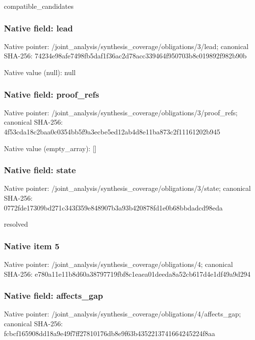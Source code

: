 \documentclass[10pt,a4paper]{article}
\begin{document}
\begingroup\raggedright\sloppy compatible\_\allowbreak{}candidates\par\endgroup

\subsubsection{Native field: lead}
Native pointer: /joint\_\allowbreak{}analysis/synthesis\_\allowbreak{}coverage/obligations/3/lead; canonical SHA-256: 74234e98afe7498fb5daf1f36ac2d78acc339464f950703b8c019892f982b90b

Native value (null): null

\subsubsection{Native field: proof\_\allowbreak{}refs}
Native pointer: /joint\_\allowbreak{}analysis/synthesis\_\allowbreak{}coverage/obligations/3/proof\_\allowbreak{}refs; canonical SHA-256: 4f53cda18c2baa0c0354bb5f9a3ecbe5ed12ab4d8e11ba873c2f11161202b945

Native value (empty\_\allowbreak{}array): []

\subsubsection{Native field: state}
Native pointer: /joint\_\allowbreak{}analysis/synthesis\_\allowbreak{}coverage/obligations/3/state; canonical SHA-256: 0772fde17309bd271c343f359e848907b3a93b420878fd1e0b68bbdadcd98eda

\begingroup\raggedright\sloppy resolved\par\endgroup

\subsubsection{Native item 5}
Native pointer: /joint\_\allowbreak{}analysis/synthesis\_\allowbreak{}coverage/obligations/4; canonical SHA-256: e780a11e11b8d60a38797719fbf8c1eaea01deeda8a52cb617d4e1df49a9d294

\subsubsection{Native field: affects\_\allowbreak{}gap}
Native pointer: /joint\_\allowbreak{}analysis/synthesis\_\allowbreak{}coverage/obligations/4/affects\_\allowbreak{}gap; canonical SHA-256: fcbcf165908dd18a9e49f7ff27810176db8e9f63b4352213741664245224f8aa
\end{document}
